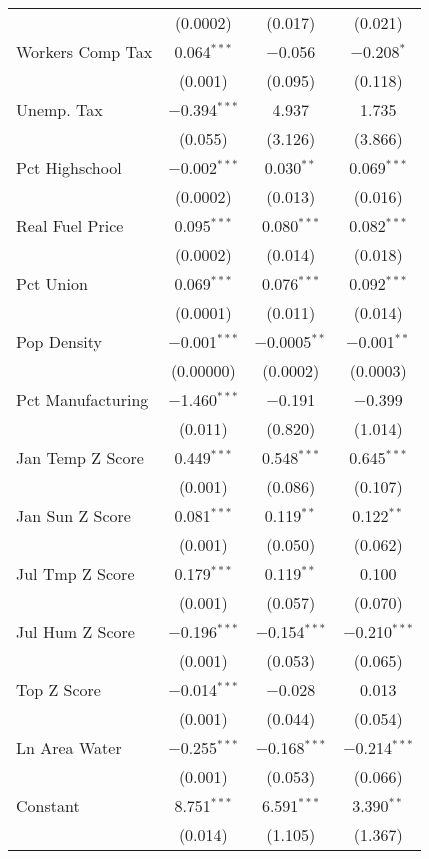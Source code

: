 \begin{table}[!htbp]
\begin{tabular}{@{\extracolsep{5pt}}lccc}
  & (0.0002) & (0.017) & (0.021) \\ 
  Workers Comp Tax & 0.064$^{***}$ & $-$0.056 & $-$0.208$^{*}$ \\ 
  & (0.001) & (0.095) & (0.118) \\ 
  Unemp. Tax & $-$0.394$^{***}$ & 4.937 & 1.735 \\ 
  & (0.055) & (3.126) & (3.866) \\ 
  Pct Highschool & $-$0.002$^{***}$ & 0.030$^{**}$ & 0.069$^{***}$ \\ 
  & (0.0002) & (0.013) & (0.016) \\ 
  Real Fuel Price & 0.095$^{***}$ & 0.080$^{***}$ & 0.082$^{***}$ \\ 
  & (0.0002) & (0.014) & (0.018) \\ 
  Pct Union & 0.069$^{***}$ & 0.076$^{***}$ & 0.092$^{***}$ \\ 
  & (0.0001) & (0.011) & (0.014) \\ 
  Pop Density & $-$0.001$^{***}$ & $-$0.0005$^{**}$ & $-$0.001$^{**}$ \\ 
  & (0.00000) & (0.0002) & (0.0003) \\ 
  Pct Manufacturing & $-$1.460$^{***}$ & $-$0.191 & $-$0.399 \\ 
  & (0.011) & (0.820) & (1.014) \\ 
  Jan Temp Z Score & 0.449$^{***}$ & 0.548$^{***}$ & 0.645$^{***}$ \\ 
  & (0.001) & (0.086) & (0.107) \\ 
  Jan Sun Z Score & 0.081$^{***}$ & 0.119$^{**}$ & 0.122$^{**}$ \\ 
  & (0.001) & (0.050) & (0.062) \\ 
  Jul Tmp Z Score & 0.179$^{***}$ & 0.119$^{**}$ & 0.100 \\ 
  & (0.001) & (0.057) & (0.070) \\ 
  Jul Hum Z Score & $-$0.196$^{***}$ & $-$0.154$^{***}$ & $-$0.210$^{***}$ \\ 
  & (0.001) & (0.053) & (0.065) \\ 
  Top Z Score & $-$0.014$^{***}$ & $-$0.028 & 0.013 \\ 
  & (0.001) & (0.044) & (0.054) \\ 
  Ln Area Water & $-$0.255$^{***}$ & $-$0.168$^{***}$ & $-$0.214$^{***}$ \\ 
  & (0.001) & (0.053) & (0.066) \\ 
  Constant & 8.751$^{***}$ & 6.591$^{***}$ & 3.390$^{**}$ \\ 
  & (0.014) & (1.105) & (1.367) \\ 

\end{tabular}
\end{table}
